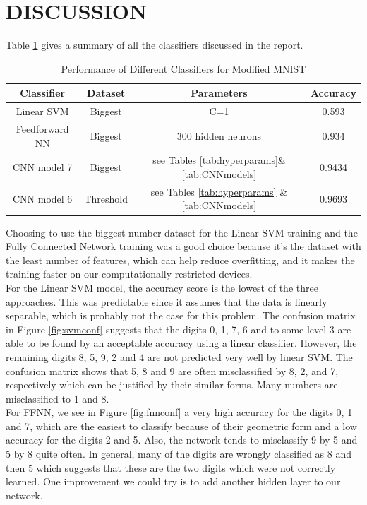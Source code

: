 \documentclass[letterpaper, 10 pt, conference]{ieeeconf}  %
\begin{document}
\section{DISCUSSION}\label{sec:discuss}
Table \ref{tab:perfAll} gives a summary of all the classifiers discussed in the report.
\begin{table}
	\centering
	\caption{Performance of Different Classifiers for Modified MNIST}
	\label{tab:perfAll}
	\begin{tabular}{cccc}
		\hline
		Classifier & Dataset& Parameters & Accuracy\\\hline
		Linear SVM & Biggest &C=1 & 0.593\\
		Feedforward NN & Biggest & 300 hidden neurons &0.934\\
		CNN model 7& Biggest & see Tables \ref{tab:hyperparams}\& \ref{tab:CNNmodels} &0.9434\\	
		CNN model 6& Threshold & see Tables \ref{tab:hyperparams} \& \ref{tab:CNNmodels} &0.9693\footnotemark\\					
	\end{tabular}
\end{table}

Choosing to use the biggest number dataset for the Linear SVM training and the Fully Connected Network training was a good choice because it's the dataset with the least number of features, which can help reduce overfitting, and it makes the training faster on our computationally restricted devices. \\
For the Linear SVM model, the accuracy score is the lowest of the three approaches. This was predictable since it assumes that the data is linearly separable, which is probably not the case for this problem. The confusion matrix in Figure \ref{fig:svmconf} suggests that the digits 0, 1, 7, 6 and to some level 3 are able to be found by an acceptable accuracy using a linear classifier. However, the remaining digits 8, 5, 9, 2 and 4 are not predicted very well by linear SVM. The confusion matrix shows that 5, 8 and 9 are often misclassified by 8, 2, and 7, respectively which can be justified by their similar forms. Many numbers are misclassified to 1 and 8.\\
For FFNN, we see in Figure \ref{fig:fnnconf} a very high accuracy for the digits 0, 1 and 7, which are the easiest to classify because of their geometric form and a low accuracy for the digits 2 and 5. Also, the network tends to misclassify 9 by 5 and 5 by 8 quite often. In general, many of the digits are wrongly classified as 8 and then 5 which suggests that these are the two digits which were not correctly learned.
One improvement we could try is to add another hidden layer to our network. \\
\end{document}
